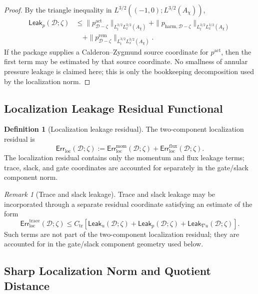 \documentclass[11pt]{article}
\numberwithin{equation}{section}
\theoremstyle{definition}
\newtheorem{definition}[definition]{Definition}
\theoremstyle{remark}
\newtheorem{remark}[remark]{Remark}
\newcommand{\loc}{\mathrm{loc}}
\newcommand{\mom}{\mathrm{mom}}
\newcommand{\flux}{\mathrm{flux}}
\newcommand{\harm}{\mathrm{harm}}
\newcommand{\Err}{\mathsf{Err}}
\newcommand{\Leak}{\mathsf{Leak}}
\newcommand{\calD}{\mathcal D}
\begin{document}
\begin{proof}
By the triangle inequality in
\(L^{3/2}((-1,0);L^{3/2}(A_\chi))\),
\[
\begin{aligned}
    \Leak_p(\calD;\zeta)
    &\le
    \|p^{\mathrm{act}}_{\calD-\zeta}\|_{L^{3/2}_tL^{3/2}_x(A_\chi)}
    +
    \|p_{\harm,\calD-\zeta}\|_{L^{3/2}_tL^{3/2}_x(A_\chi)}
\\
    &\quad+
    \|p^{\mathrm{rem}}_{\calD-\zeta}\|_{L^{3/2}_tL^{3/2}_x(A_\chi)}.
\end{aligned}
\]
If the package supplies a Calderon--Zygmund source coordinate for
\(p^{\mathrm{act}}\), then the first term may be estimated by that source
coordinate.  No smallness of annular pressure leakage is claimed here; this is
only the bookkeeping decomposition used by the localization norm.
\end{proof}

\subsection{Localization Leakage Residual Functional}
\label{loc:sec:residual-functional}

\begin{definition}[Localization leakage residual]
\label{loc:def:localization-leakage-residual}
The two-component localization residual is
\[
    \Err_{\loc}(\calD;\zeta)
    :=
    \Err_{\loc}^{\mom}(\calD;\zeta)
    +
    \Err_{\loc}^{\flux}(\calD;\zeta).
\]
The localization residual contains only the momentum and flux leakage terms;
trace, slack, and gate coordinates are accounted for separately in the
gate/slack component norm.
\end{definition}

\begin{remark}[Trace and slack leakage]
Trace and slack leakage may be incorporated through a separate residual
coordinate satisfying an estimate of the form
\[
    \Err_{\loc}^{\mathrm{trace}}(\calD;\zeta)
    \le
    C_{\mathrm{tr}}
    \left[
        \Leak_u(\calD;\zeta)
        +
        \Leak_p(\calD;\zeta)
        +
        \Leak_{\nabla u}(\calD;\zeta)
    \right].
\]
Such terms are not part of the two-component localization residual; they are
accounted for in the gate/slack component geometry used below.
\end{remark}

\subsection{Sharp Localization Norm and Quotient Distance}
\label{loc:sec:sharp-loc-norm}
\end{document}
